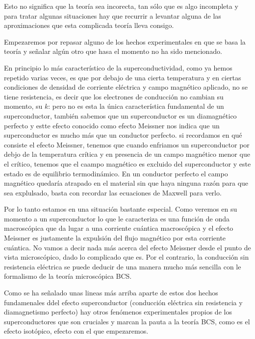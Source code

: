 Esto no significa que la teoría sea incorecta, tan sólo que es algo incompleta y para tratar algunas situaciones hay que recurrir a levantar alguna de las aproximaciones que esta complicada teoría lleva consigo.

Empezaremos por repasar alguno de los hechos experimentales en que se basa la teoría y señalar algún otro que hasa el momento no ha sido mencionado.

En principio lo más característico de la superconductividad, como ya hemos repetido varias veces, es que por debajo de una cierta temperatura y en ciertas condiciones de densidad de corriente eléctrica y campo magnético aplicado, no se tiene resistencia, es decir que los electrones de conducción no cambian su momento, su $k$: pero no es esta la única característica fundamental de un superconductor, también sabemos que un superconductor es un diamagnético perfecto y estte efecto conocido como efecto Meissner nos indica que un superconductor es mucho más que un conductor perfecto. si recordamos en qué consiste el efecto Meissner, tenemos que cuando enfriamos un superconductor por debjo de la temperatura crítica y en presencia de un campo magnético menor que el crítico, tenemos que el caampo magnético es excluido del superconductor y este estado es de equilibrio termodinámico. En un conductor perfecto el campo magnético quedaría atrapado en el material sin que haya ninguna razón para que sea explulsado, basta con recordar las ecuaciones de Maxwell para verlo.

Por lo tanto estamos en una situación bastante especial. Como veremos en su momento a un superconductor lo que le caracteriza es una función de onda macroscópica que da lugar a una corriente cuántica macroscópica y el efecto Meissner es justamente la expulsión del flujo magnético por esta corriente cuántica. No vamos a decir nada más acerca del efecto Meissner desde el punto de vista microscópico, dado lo complicado que es. Por el contrario, la conducción sin resistencia eléctrica se puede deducir de una manera mucho más sencilla con le formalismo de la teoría microscópica BCS.

Como se ha señalado unas lineas más arriba aparte de estos dos hechos fundamenales ddel efecto superconductor (conducción eléctrica sin resistencia y diamagnetismo perfecto) hay otros fenómenos experimentales propios de los superconductores que son cruciales y marcan la pauta a la teoría BCS, como es el efecto isotópico, efecto con el que empezaremos.

